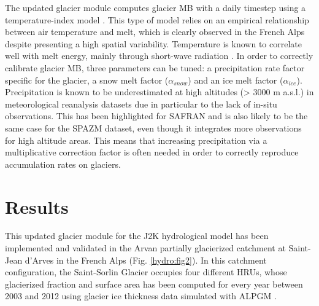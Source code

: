 The updated glacier module computes glacier MB with a daily timestep using a temperature-index model \citep{hock_temperature_2003}. This type of model relies on an empirical relationship between air temperature and melt, which is clearly observed in the French Alps despite presenting a high spatial variability. Temperature is known to correlate well with melt energy, mainly through short-wave radiation \citep{sicart_glacier_2008}. In order to correctly calibrate glacier MB, three parameters can be tuned: a precipitation rate factor specific for the glacier, a snow melt factor ($\alpha_{snow}$) and an ice melt factor ($\alpha_{ice}$). Precipitation is known to be underestimated at high altitudes (> 3000 m a.s.l.) in meteorological reanalysis datasets due in particular to the lack of in-situ observations. This has been highlighted for SAFRAN \citep{vionnet_sub-kilometer_2019} and is also likely to be the same case for the SPAZM dataset, even though it integrates more observations for high altitude areas. This means that increasing precipitation via a multiplicative correction factor is often needed in order to correctly reproduce accumulation rates on glaciers. 

\section{Results}

This updated glacier module for the J2K hydrological model has been implemented and validated in the Arvan partially glacierized catchment at Saint-Jean d'Arves in the French Alps (Fig. \ref{hydro:fig2}). In this catchment configuration, the Saint-Sorlin Glacier occupies four different HRUs, whose glacierized fraction and surface area has been computed for every year between 2003 and 2012 using glacier ice thickness data simulated with ALPGM \citep{bolibar_alpgm_2020}.


